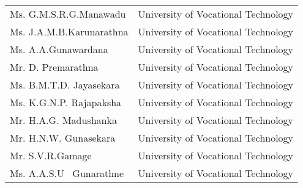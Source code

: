 \begin{longtable}{ L{4.8cm}  L{6.5cm} }
Ms. G.M.S.R.G.Manawadu & University of Vocational Technology\\
Ms. J.A.M.B.Karunarathna & University of Vocational Technology\\
Ms. A.A.Gunawardana & University of Vocational Technology\\
Mr. D. Premarathna & University of Vocational Technology\\
Ms. B.M.T.D. Jayasekara & University of Vocational Technology\\
Ms. K.G.N.P. Rajapaksha & University of Vocational Technology\\
Mr. H.A.G. Madushanka & University of Vocational Technology\\
Mr. H.N.W. Gunasekara & University of Vocational Technology\\
Mr. S.V.R.Gamage & University of Vocational Technology\\
Ms. A.A.S.U  Gunarathne & University of Vocational Technology\\
       
        
\end{longtable}    
\newpage
\singlespacing